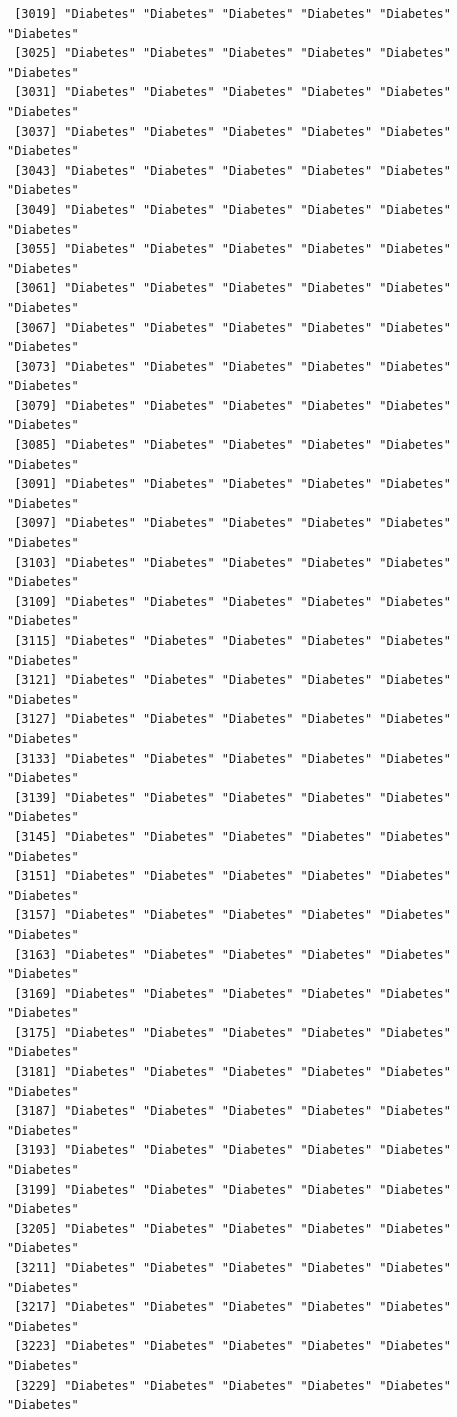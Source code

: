 \documentclass[
  letterpaper,
  DIV=11,
  numbers=noendperiod]{scrartcl}
\begin{document}
\begin{verbatim}
 [3019] "Diabetes" "Diabetes" "Diabetes" "Diabetes" "Diabetes" "Diabetes"
 [3025] "Diabetes" "Diabetes" "Diabetes" "Diabetes" "Diabetes" "Diabetes"
 [3031] "Diabetes" "Diabetes" "Diabetes" "Diabetes" "Diabetes" "Diabetes"
 [3037] "Diabetes" "Diabetes" "Diabetes" "Diabetes" "Diabetes" "Diabetes"
 [3043] "Diabetes" "Diabetes" "Diabetes" "Diabetes" "Diabetes" "Diabetes"
 [3049] "Diabetes" "Diabetes" "Diabetes" "Diabetes" "Diabetes" "Diabetes"
 [3055] "Diabetes" "Diabetes" "Diabetes" "Diabetes" "Diabetes" "Diabetes"
 [3061] "Diabetes" "Diabetes" "Diabetes" "Diabetes" "Diabetes" "Diabetes"
 [3067] "Diabetes" "Diabetes" "Diabetes" "Diabetes" "Diabetes" "Diabetes"
 [3073] "Diabetes" "Diabetes" "Diabetes" "Diabetes" "Diabetes" "Diabetes"
 [3079] "Diabetes" "Diabetes" "Diabetes" "Diabetes" "Diabetes" "Diabetes"
 [3085] "Diabetes" "Diabetes" "Diabetes" "Diabetes" "Diabetes" "Diabetes"
 [3091] "Diabetes" "Diabetes" "Diabetes" "Diabetes" "Diabetes" "Diabetes"
 [3097] "Diabetes" "Diabetes" "Diabetes" "Diabetes" "Diabetes" "Diabetes"
 [3103] "Diabetes" "Diabetes" "Diabetes" "Diabetes" "Diabetes" "Diabetes"
 [3109] "Diabetes" "Diabetes" "Diabetes" "Diabetes" "Diabetes" "Diabetes"
 [3115] "Diabetes" "Diabetes" "Diabetes" "Diabetes" "Diabetes" "Diabetes"
 [3121] "Diabetes" "Diabetes" "Diabetes" "Diabetes" "Diabetes" "Diabetes"
 [3127] "Diabetes" "Diabetes" "Diabetes" "Diabetes" "Diabetes" "Diabetes"
 [3133] "Diabetes" "Diabetes" "Diabetes" "Diabetes" "Diabetes" "Diabetes"
 [3139] "Diabetes" "Diabetes" "Diabetes" "Diabetes" "Diabetes" "Diabetes"
 [3145] "Diabetes" "Diabetes" "Diabetes" "Diabetes" "Diabetes" "Diabetes"
 [3151] "Diabetes" "Diabetes" "Diabetes" "Diabetes" "Diabetes" "Diabetes"
 [3157] "Diabetes" "Diabetes" "Diabetes" "Diabetes" "Diabetes" "Diabetes"
 [3163] "Diabetes" "Diabetes" "Diabetes" "Diabetes" "Diabetes" "Diabetes"
 [3169] "Diabetes" "Diabetes" "Diabetes" "Diabetes" "Diabetes" "Diabetes"
 [3175] "Diabetes" "Diabetes" "Diabetes" "Diabetes" "Diabetes" "Diabetes"
 [3181] "Diabetes" "Diabetes" "Diabetes" "Diabetes" "Diabetes" "Diabetes"
 [3187] "Diabetes" "Diabetes" "Diabetes" "Diabetes" "Diabetes" "Diabetes"
 [3193] "Diabetes" "Diabetes" "Diabetes" "Diabetes" "Diabetes" "Diabetes"
 [3199] "Diabetes" "Diabetes" "Diabetes" "Diabetes" "Diabetes" "Diabetes"
 [3205] "Diabetes" "Diabetes" "Diabetes" "Diabetes" "Diabetes" "Diabetes"
 [3211] "Diabetes" "Diabetes" "Diabetes" "Diabetes" "Diabetes" "Diabetes"
 [3217] "Diabetes" "Diabetes" "Diabetes" "Diabetes" "Diabetes" "Diabetes"
 [3223] "Diabetes" "Diabetes" "Diabetes" "Diabetes" "Diabetes" "Diabetes"
 [3229] "Diabetes" "Diabetes" "Diabetes" "Diabetes" "Diabetes" "Diabetes"

\end{verbatim}
\end{document}
